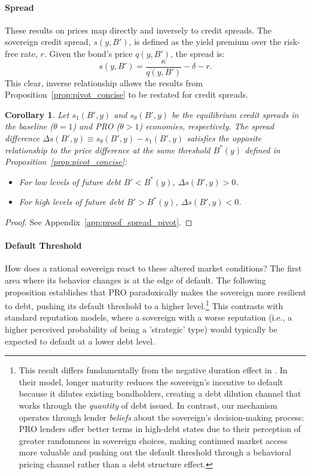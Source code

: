 \documentclass[12pt]{article}
\theoremstyle{plain}
\newtheorem{corollary}{Corollary}
\begin{document}
\paragraph{Spread}
These results on prices map directly and inversely to credit spreads. The
sovereign credit spread, $s(y, B')$, is defined as the yield premium over the
risk-free rate, $r$. Given the bond's price $q(y, B')$, the spread is:
\begin{equation}
	s(y, B') = \frac{\kappa}{q(y, B')} - \delta - r.
	\label{eq:spread_definition}
\end{equation}
This clear, inverse relationship allows the results from Proposition~\ref{prop:pivot_concise} to be restated for credit spreads.

\begin{corollary}
	\label{cor:spread_pivot}
	Let $s_1(B', y)$ and $s_\theta(B', y)$ be the equilibrium credit spreads in the baseline ($\theta=1$) and PRO ($\theta>1$) economies, respectively. The spread difference $\Delta s(B', y) \equiv s_\theta(B', y) - s_1(B', y)$ satisfies the opposite relationship to the price difference at the same threshold $B^*(y)$ defined in Proposition~\ref{prop:pivot_concise}:
	\begin{itemize}
		\item For low levels of future debt $B' < B^*(y)$, $\Delta s(B', y) > 0$.
		\item For high levels of future debt $B' > B^*(y)$, $\Delta s(B', y) < 0$.
	\end{itemize}
\end{corollary}

\begin{proof}
	See Appendix~\ref{app:proof_spread_pivot}.
\end{proof}

\paragraph{Default Threshold}
How does a rational sovereign react to these altered market conditions? The
first area where its behavior changes is at the edge of default. The following
proposition establishes that PRO paradoxically makes the sovereign more
resilient to debt, pushing its default threshold to a higher
level.\footnote{This result differs fundamentally from the negative duration
	effect in \citep{ChatterjeeEyigungor2012}. In their model, longer maturity
	reduces the sovereign's incentive to default because it dilutes existing
	bondholders, creating a debt dilution channel that works through the
	\emph{quantity} of debt issued. In contrast, our mechanism operates through
	lender \emph{beliefs} about the sovereign's decision-making process: PRO
	lenders offer better terms in high-debt states due to their perception of
	greater randomness in sovereign choices, making continued market access more
	valuable and pushing out the default threshold through a behavioral pricing
	channel rather than a debt structure effect.} This contrasts with standard
reputation models, where a sovereign with a worse reputation (i.e., a higher
perceived probability of being a 'strategic' type) would typically be expected
to default at a lower debt level.
\end{document}
